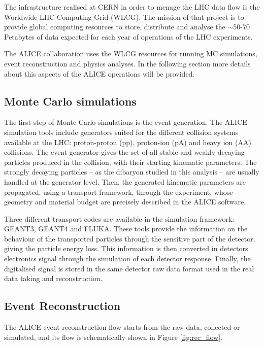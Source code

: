 The infrastructure realised at CERN in order to menage the LHC data flow is the Worldwide 
LHC Computing Grid (WLCG). The mission of that project is to provide global 
computing resources to store, distribute and analyse the $\sim$50-70 Petabytes of data expected for each
year of operations of the LHC experiments.

The ALICE collaboration uses the WLCG resources for running MC simulations, event reconstruction and physics
analyses. In the following section more details about this aspects of the ALICE operations will be 
provided.

%
\subsection{Monte Carlo simulations} \label{sec:montecarlo}

The first step of Monte-Carlo simulations is the event generation. 
The ALICE simulation tools include generators suited for the different collision systems available at the LHC: proton-proton (pp), proton-ion (pA) and heavy ion (AA) collisions.
The event generator gives the set of all stable and weakly decaying particles produced in the collision,
with their starting kinematic parameters. The strongly decaying particles -- as the \dst dibaryon studied
in this analysis -- are usually handled at the generator level.
Then, the generated kinematic parameters are propagated, using a transport framework, through the
experiment, whose geometry and material budget are precisely described in the ALICE software.

Three different transport codes are available in the simulation framework: GEANT3, GEANT4 and FLUKA.
These tools provide the information on the behaviour of the transported particles through the sensitive
part of the detector, giving the particle energy loss. 
This information is then converted in detectors electronics signal through the simulation of each detector
response. Finally, the digitalised signal is stored in the same detector raw data format used in the 
real data taking and reconstruction.

%
\subsection{Event Reconstruction} \label{sec:event_rec}

The ALICE event reconstruction flow starts from the raw data, collected or simulated, and its flow is 
schematically shown in Figure \ref{fig:rec_flow}. 

